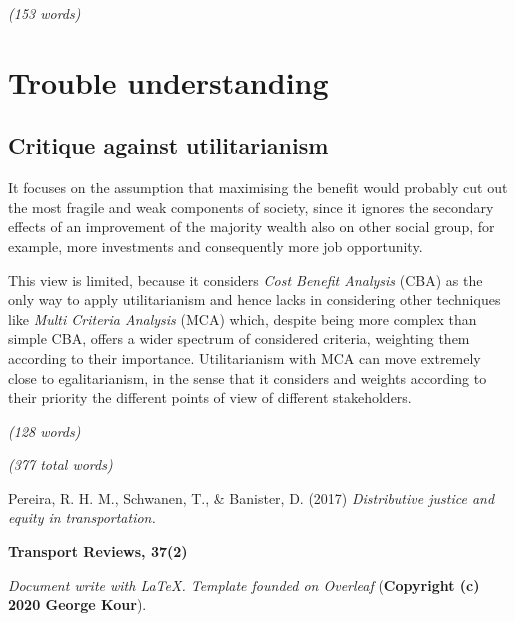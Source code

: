 \emph{(153 words)}

\section{Trouble understanding}
\subsection{Critique against utilitarianism}
It focuses on the assumption that maximising the benefit would probably cut out the most fragile and weak components of society, since it ignores the secondary effects of an improvement of the majority wealth also on other social group, for example, more investments and consequently more job opportunity.

This view is limited, because it considers \textit{Cost Benefit Analysis} (CBA) as the only way to apply utilitarianism and hence lacks in considering other techniques like \textit{Multi Criteria Analysis} (MCA) which, despite being more complex than simple CBA, offers a wider spectrum of considered criteria, weighting them according to their importance.
Utilitarianism with MCA can move extremely close to egalitarianism, in the sense that it considers and weights according to their priority the different points of view of different stakeholders.

\emph{(128 words)}

\emph{(377 total words)}

\newpage
\begin{thebibliography}{99}

Pereira, R. H. M., Schwanen, T., \& Banister, D. (2017)
\textit{Distributive justice and equity in transportation.}

\textbf{Transport Reviews, 37(2)}
\end{thebibliography}

\textit{Document write with \LaTeX. Template founded on Overleaf} (\textbf{Copyright (c) 2020 George Kour}).